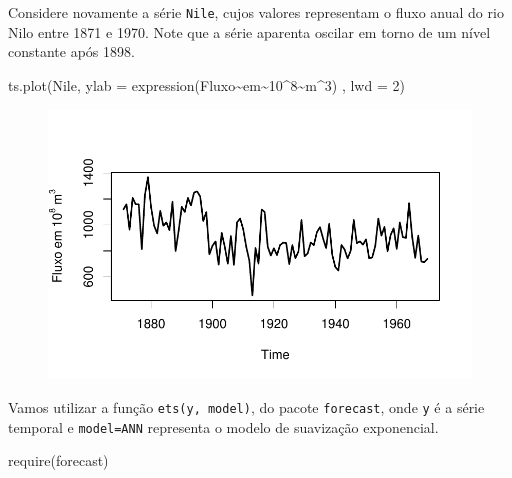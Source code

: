 \documentclass[
  letterpaper,
  DIV=11,
  numbers=noendperiod]{scrartcl}
\newenvironment{Shaded}{\begin{snugshade}}{\end{snugshade}}
\newcommand{\AttributeTok}[1]{\textcolor[rgb]{0.40,0.45,0.13}{#1}}
\newcommand{\DecValTok}[1]{\textcolor[rgb]{0.68,0.00,0.00}{#1}}
\newcommand{\FunctionTok}[1]{\textcolor[rgb]{0.28,0.35,0.67}{#1}}
\newcommand{\NormalTok}[1]{\textcolor[rgb]{0.00,0.23,0.31}{#1}}
\newcommand{\SpecialCharTok}[1]{\textcolor[rgb]{0.37,0.37,0.37}{#1}}
\theoremstyle{plain}
\theoremstyle{plain}
\theoremstyle{definition}
\theoremstyle{definition}
\theoremstyle{remark}
\begin{document}
Considere novamente a série \texttt{Nile}, cujos valores representam o
fluxo anual do rio Nilo entre 1871 e 1970. Note que a série aparenta
oscilar em torno de um nível constante após 1898.

\begin{Shaded}
\begin{Highlighting}[]
\FunctionTok{ts.plot}\NormalTok{(Nile, }\AttributeTok{ylab =} \FunctionTok{expression}\NormalTok{(Fluxo}\SpecialCharTok{\textasciitilde{}}\NormalTok{em}\SpecialCharTok{\textasciitilde{}}\DecValTok{10}\SpecialCharTok{\^{}}\DecValTok{8}\SpecialCharTok{\textasciitilde{}}\NormalTok{m}\SpecialCharTok{\^{}}\DecValTok{3}\NormalTok{) , }\AttributeTok{lwd =} \DecValTok{2}\NormalTok{)}
\end{Highlighting}
\end{Shaded}

\begin{figure}[H]

{\centering \includegraphics{suave_exponencial_files/figure-pdf/unnamed-chunk-1-1.pdf}

}

\end{figure}

Vamos utilizar a função \texttt{ets(y,\ model)}, do pacote
\texttt{forecast}, onde \texttt{y} é a série temporal e
\texttt{model=\textquotesingle{}ANN\textquotesingle{}} representa o
modelo de suavização exponencial.

\begin{Shaded}
\begin{Highlighting}[]
\FunctionTok{require}\NormalTok{(forecast)}
\end{Highlighting}
\end{Shaded}
\end{document}
